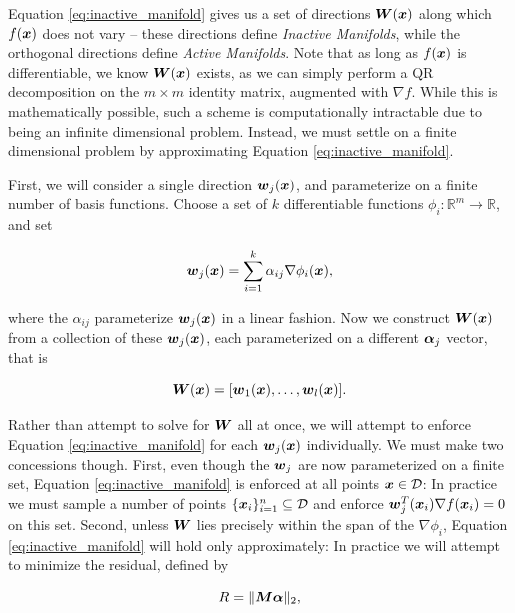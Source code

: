 \documentclass[]{aiaa-tc}%
\newcommand{\dom}{\mathcal{D}}
\begin{document}
Equation \ref{eq:inactive_manifold} gives us a set of directions $\boldsymbol{W}(\boldsymbol{x})$ along which $f(\boldsymbol{x})$ does not vary -- these directions define \emph{Inactive Manifolds}, while the orthogonal directions define \emph{Active Manifolds}. Note that as long as $f(\boldsymbol{x})$ is differentiable, we know $\boldsymbol{W}(\boldsymbol{x})$ exists, as we can simply perform a QR decomposition on the $m\times m$ identity matrix, augmented with $\nabla f$. While this is mathematically possible, such a scheme is computationally intractable due to being an infinite dimensional problem. Instead, we must settle on a finite dimensional problem by approximating Equation \ref{eq:inactive_manifold}.

First, we will consider a single direction $\boldsymbol{w}_j(\boldsymbol{x})$, and parameterize on a finite number of basis functions. Choose a set of $k$ differentiable functions $\phi_i:\mathbb{R}^m\to\mathbb{R}$, and set

\begin{equation}
\label{eq:parameterized_w}
\boldsymbol{w}_j(\boldsymbol{x}) = \sum_{i=1}^k \alpha_{ij}\nabla\phi_i(\boldsymbol{x}),
\end{equation}
%
%
%
%

where the $\alpha_{ij}$ parameterize $\boldsymbol{w}_j(\boldsymbol{x})$ in a linear fashion. Now we construct $\boldsymbol{W}(\boldsymbol{x})$ from a collection of these $\boldsymbol{w}_j(\boldsymbol{x})$, each parameterized on a different $\boldsymbol{\alpha}_j$ vector, that is

\begin{equation}
\boldsymbol{W}(\boldsymbol{x}) = [\boldsymbol{w}_1(\boldsymbol{x}),\dots,\boldsymbol{w}_l(\boldsymbol{x})].
\end{equation}

Rather than attempt to solve for $\boldsymbol{W}$ all at once, we will attempt to enforce Equation \ref{eq:inactive_manifold} for each $\boldsymbol{w}_j(\boldsymbol{x})$ individually. We must make two concessions though. First, even though the $\boldsymbol{w}_j$ are now parameterized on a finite set, Equation \ref{eq:inactive_manifold} is enforced at all points $\vx\in\dom$: In practice we must sample a number of points $\{\vx_i\}_{i=1}^n\subseteq\dom$ and enforce $\boldsymbol{w}_j^T(\boldsymbol{x}_i)\nabla f(\boldsymbol{x}_i)=0$ on this set. Second, unless $\boldsymbol{W}$ lies precisely within the span of the $\nabla\phi_i$, Equation \ref{eq:inactive_manifold} will hold only approximately: In practice we will attempt to minimize the residual, defined by
\nomenclature{$n$}{Number of sample points in $\dom$}%

\begin{equation}
\label{eq:residual}
R = \|\boldsymbol{M}\boldsymbol{\alpha}\|_2,
\end{equation}
\end{document}
